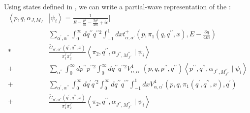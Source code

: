 Using states defined in , we can write a partial-wave representation of the :
\begin{equation}
    \begin{aligned}
        \left\langle p, q, \alpha_{J, M_J}\right. & \left|\psi_i\right\rangle=\frac{1}{E-\frac{p^2}{m}-\frac{3 q^2}{4 m}+i \epsilon}[ \\
        & \sum_{\alpha^{\prime}, \alpha^{\prime \prime}} \int_0^{\infty} d q^{\prime \prime} q^{\prime \prime 2} \int_{-1}^1 d x t_{\alpha, \alpha^{\prime}}^{+}\left(p, \pi_1\left(q, q^{\prime \prime}, x\right), E-\frac{3 q}{4 m}\right) \\
        * & \frac{\tilde{G}_{\alpha^{\prime}, \alpha^{\prime \prime}}\left(q^{\prime}, q^{\prime \prime}, x\right)}{\pi_1^{l^{\prime}} \pi_2^{l^{\prime \prime}}}\left\langle\pi_2, q^{\prime \prime}, \alpha_{J^{\prime \prime}, M_{J^{\prime \prime}}^{\prime \prime}} \mid \psi_i\right\rangle \\
        +\quad & \sum_{\alpha^{\prime \prime}} \int_0^{\infty} d p^{\prime \prime} p^{\prime \prime 2} \int_0^{\infty} d q^{\prime \prime} q^{\prime \prime 2} V_{\alpha, \alpha^{\prime \prime}}^4\left(p, q, p^{\prime \prime}, q^{\prime \prime}\right)\left\langle p^{\prime \prime}, q^{\prime \prime}, \alpha_{J^{\prime \prime}, M_{J^{\prime \prime}}^{\prime \prime}} \mid \psi_i\right\rangle \\
        +\quad & \sum_{\alpha^{\prime}, \alpha^{\prime \prime}} \int_0^{\infty} d q^{\prime} q^{\prime 2} \int_0^{\infty} d q^{\prime \prime} q^{\prime \prime \prime} \int_{-1}^1 d x V_{\alpha, \alpha^{\prime}}^4\left(p, q, \pi_1\left(q^{\prime}, q^{\prime \prime}, x\right), q^{\prime}\right) \\
        +\quad & \frac{\tilde{G}_{\alpha^{\prime}, \alpha^{\prime \prime}}\left(q^{\prime}, q^{\prime \prime}, x\right)}{\pi_1^{l^{\prime}} \pi_2^{l^{\prime \prime}}}\left\langle\pi_2, q^{\prime \prime}, \alpha_{J^{\prime \prime}, M_{J^{\prime \prime}}^{\prime \prime}} \mid \psi_i\right\rangle\\

\end{aligned}
\end{equation}

